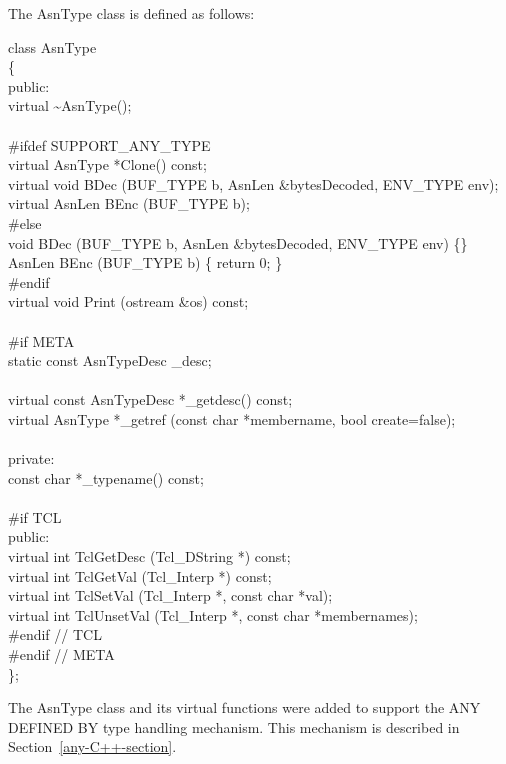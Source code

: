 The {\C AsnType} class is defined as follows:
\begin{Ccode}
class AsnType\\
\{\\
public:\+\\
  virtual			\>\>\~{}AsnType();\\
\\
\<\#ifdef SUPPORT\_ANY\_TYPE\\
  virtual AsnType		\>\>*Clone() const;\\
  virtual void			\>\>BDec (BUF\_TYPE b, AsnLen \&bytesDecoded, ENV\_TYPE env);\\
  virtual AsnLen		\>\>BEnc (BUF\_TYPE b);\\
\<\#else\\
  void				\>\>BDec (BUF\_TYPE b, AsnLen \&bytesDecoded, ENV\_TYPE env) \{\}\\
  AsnLen			\>\>BEnc (BUF\_TYPE b) \{ return 0; \}\\
\<\#endif\\
  virtual void			\>\>Print (ostream \&os) const;\\
\\
\<\#if META\\
  static const AsnTypeDesc	\>\>\_desc;\\
\\
  virtual const AsnTypeDesc	\>\>*\_getdesc() const;\\
  virtual AsnType		\>\>*\_getref (const char *membername, bool create=false);\\
\\
\<private:\\
  const char			\>\>*\_typename() const;\\
\-\\
\#if TCL\\
public:\+\\
  virtual int			\>\>TclGetDesc (Tcl\_DString *) const;\\
  virtual int			\>\>TclGetVal (Tcl\_Interp *) const;\\
  virtual int			\>\>TclSetVal (Tcl\_Interp *, const char *val);\\
  virtual int			\>\>TclUnsetVal (Tcl\_Interp *, const char *membernames);\-\\
\#endif // TCL\\
\#endif // META\\
\};
\end{Ccode}

The {\C AsnType} class and its virtual functions were added to
support the ANY DEFINED BY type handling mechanism.  This mechanism is
described in Section~\ref{any-C++-section}.

